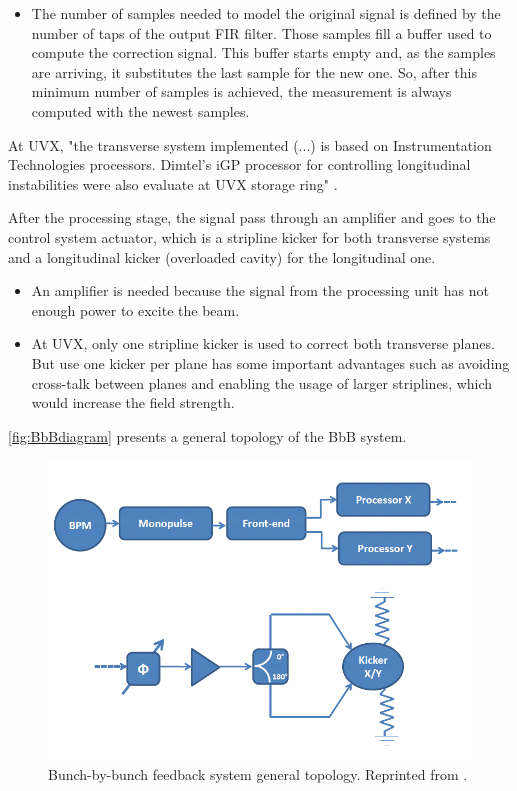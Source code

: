 \begin{itemize}
	\item The number of samples needed to model the original signal is defined by the number of taps of the output FIR filter. Those samples fill a buffer used to compute the correction signal. This buffer starts empty and, as the samples are arriving, it substitutes the last sample for the new one. So, after this minimum number of samples is achieved, the measurement is always computed with the newest samples.
\end{itemize}

At UVX, "the transverse system implemented (...) is based on Instrumentation Technologies processors. Dimtel's iGP processor for controlling longitudinal instabilities were also evaluate at UVX storage ring" \cite{digFeedback}.

After the processing stage, the signal pass through an amplifier and goes to the control system actuator, which is a stripline kicker for both transverse systems and a longitudinal kicker (overloaded cavity) for the longitudinal one.

\begin{itemize}
	\item An amplifier is needed because the signal from the processing unit has not enough power to excite the beam.
	\item At UVX, only one stripline kicker is used to correct both transverse planes. But use one kicker per plane has some important advantages such as avoiding cross-talk between planes and enabling the usage of larger striplines, which would increase the field strength.
\end{itemize}

\autoref{fig:BbBdiagram} presents a general topology of the BbB system.

\begin{figure}[!htb]
	\centering
	\includegraphics[width=0.8\linewidth]{./Figures/BbBdiagram.png}
	\caption{Bunch-by-bunch feedback system general topology. Reprinted from \cite{digFeedback}.}
	\label{fig:BbBdiagram}
\end{figure}

